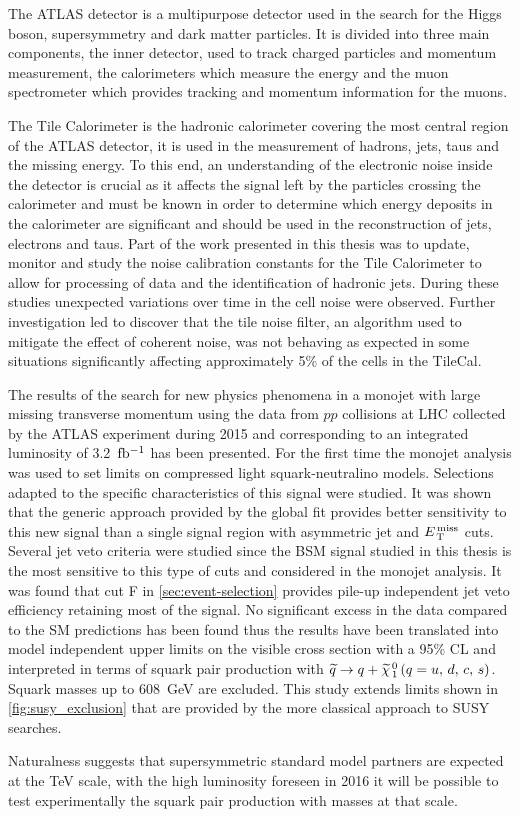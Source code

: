 The ATLAS detector is a multipurpose detector used in the search for the Higgs
boson, supersymmetry and dark matter particles. It is divided into three main
components, the inner detector, used to track charged particles and momentum
measurement, the calorimeters which measure the energy and the muon spectrometer
which provides tracking and momentum information for the muons.

The Tile Calorimeter is the hadronic calorimeter covering the most central
region of the ATLAS detector, it is used in the measurement of hadrons, jets,
taus and the missing energy. To this end, an understanding of the electronic
noise inside the detector is crucial as it affects the signal left by the
particles crossing the calorimeter and must be known in order to determine which
energy deposits in the calorimeter are significant and should be used in the
reconstruction of jets, electrons and taus. Part of the work presented in this
thesis was to update, monitor and study the noise calibration constants for the
Tile Calorimeter to allow for processing of data and the identification of
hadronic jets. During these studies unexpected variations over time in the cell
noise were observed. Further investigation led to discover that the tile noise
filter, an algorithm used to mitigate the effect of coherent noise, was not
behaving as expected in some situations significantly affecting approximately
5\% of the cells in the TileCal.

The results of the search for new physics phenomena in a monojet with large
missing transverse momentum using the data from $pp$ collisions at LHC collected
by the ATLAS experiment during 2015 and corresponding to an integrated
luminosity of 3.2~$\mbox{fb$^{-1}$}$ has been presented. For the first time the monojet
analysis was used to set limits on compressed light squark-neutralino
models. Selections adapted to the specific characteristics of this signal were
studied. It was shown that the generic approach provided by the global fit
provides better sensitivity to this new signal than a single signal region with
asymmetric jet and $E_\mathrm{\, T}^\mathrm{\, miss}$ cuts. Several jet veto criteria were studied since the
BSM signal studied in this thesis is the most sensitive to this type of cuts and
considered in the monojet analysis. It was found that cut F in
\cref{sec:event-selection} provides pile-up independent jet veto efficiency
retaining most of the signal. No significant excess in the data compared to the
SM predictions has been found thus the results have been translated into model
independent upper limits on the visible cross section with a 95\% CL and
interpreted in terms of squark pair production with $\widetilde{q} \rightarrow q + \widetilde{\chi}_{\, 1}^{\, 0}\, (q = u,\, d,\, c,\, s)$. Squark masses
up to 608~GeV are excluded. This study extends limits shown in
\cref{fig:susy_exclusion} that are provided by the more classical approach to
SUSY searches.

Naturalness suggests that supersymmetric standard model partners are expected at
the TeV scale, with the high luminosity foreseen in 2016 it will be possible to
test experimentally the squark pair production with masses at that scale.
